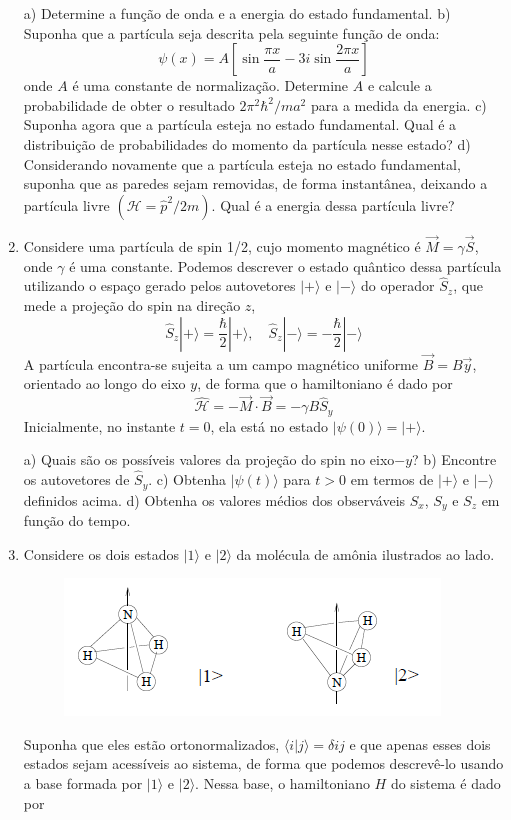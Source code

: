 \begin{enumerate}[start=1,label={\bfseries Q\arabic*.}]
a) Determine a função de onda e a energia do estado fundamental.
b) Suponha que a partícula seja descrita pela seguinte função de onda:
$$
\psi(x)=A\left[\sin \frac{\pi x}{a}-3 i \sin \frac{2 \pi x}{a}\right]
$$
onde $A$ é uma constante de normalização. Determine $A$ e calcule a probabilidade de obter o resultado $2 \pi^{2} \hbar^{2} / ma^{2}$ para a medida da energia.
c) Suponha agora que a partícula esteja no estado fundamental. Qual é a distribuição de probabilidades do momento da partícula nesse estado?
d) Considerando novamente que a partícula esteja no estado fundamental, suponha que as paredes sejam removidas, de forma instantânea, deixando a partícula livre $( \mathcal{H} = \hat{p}^{2}/2m)$. Qual é a energia dessa partícula livre?





\item Considere uma partícula de spin 1/2, cujo momento magnético é $\vec{M} = \gamma \vec{S}$, onde $\gamma$ é uma constante. Podemos descrever o estado quântico dessa partícula utilizando o espaço gerado pelos autovetores $| + \rangle$ e $| - \rangle$ do operador $\hat{S}_{z}$, que mede a projeção do spin na direção $z$,
$$
\hat{S}_{z}|+\rangle=\frac{\hbar}{2}|+\rangle, \quad \hat{S}_{z}|-\rangle=-\frac{\hbar}{2}|-\rangle
$$
A partícula encontra-se sujeita a um campo magnético uniforme $\vec{B} = B\vec{y}$, orientado ao longo do eixo $y$, de forma que o hamiltoniano é dado por
$$
\hat{\mathcal{H}}=-\vec{M} \cdot \vec{B}=-\gamma B \hat{S}_{y}
$$
Inicialmente, no instante $t = 0$, ela está no estado $|\psi(0)\rangle = |+\rangle$.


a) Quais são os possíveis valores da projeção do spin no eixo$-y$?
b) Encontre os autovetores de $\hat{S}_{y}$.
c) Obtenha $|\psi(t)\rangle$ para $t > 0$ em termos de $| + \rangle$ e $| - \rangle$ definidos acima.
d) Obtenha os valores médios dos observáveis $S_{x}$, $S_{y}$ e $S_{z}$ em função do tempo.




\item Considere os dois estados $|1\rangle$ e $|2\rangle$ da molécula de amônia ilustrados ao lado.

\begin{figure}
  \centering
  \includegraphics[scale=0.8]{quantica-img/estado.png}
\end{figure}
Suponha que eles estão ortonormalizados, $\langle i | j \rangle = \delta ij $ e que apenas esses dois estados sejam acessíveis ao sistema, de forma que podemos descrevê-lo usando a base formada por $|1\rangle$ e $|2\rangle$. Nessa base, o hamiltoniano $H$ do sistema é dado por


\end{enumerate}
